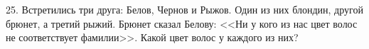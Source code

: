 25. Встретились три друга: Белов, Чернов и Рыжов. Один из них блондин, другой брюнет, а третий рыжий. Брюнет сказал Белову: <<Ни у кого из нас цвет волос не соответствует фамилии>>. Какой цвет волос у каждого из них?\\
